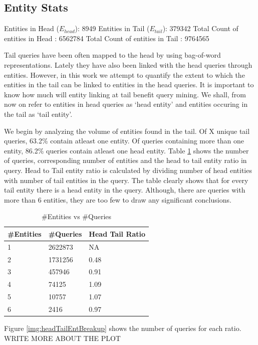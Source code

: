 \subsection{Entity Stats}
Entities in Head ($E_{head}$): 8949
Entities in Tail ($E_{tail}$): 379342
Total Count of entities in Head : 6562784
Total Count of entities in Tail : 9764565
 

Tail queries have been often mapped to the head \cite{} by using bag-of-word representations.
Lately they have also been linked with the head queries through entities. However, in this work
we attempt to quantify the extent to which the entities in the tail can be linked to entities 
in the head queries. It is important to know how much will entity linking at tail benefit query mining. 
We shall, from now on refer to entities in head queries as `head entity' 
and entities occuring in the tail as `tail entity'. 

We begin by analyzing the volume of entities found in the tail. Of X unique tail queries,
63.2\% contain atleast one entity. Of queries containing more than one entity,  
86.2\% queries contain atleast one head entity. Table \ref{table:entDist} shows the number of 
queries, corresponding number of entities and the head to tail entity ratio in query. 
Head to Tail entity ratio is calculated by dividing number of head entities with number of 
tail entities in the query. The table clearly shows that for every tail entity there is a 
head entity in the query. Although, there are queries with more than 6 entities, 
they are too few to draw any significant conclusions. 
\begin{table}
\caption{\#Entities vs \#Queries}
\label{table:entDist}
\centering
\begin{tabular}{|l|l|l|}
\hline
\#Entities & \#Queries & Head Tail Ratio \\ \hline
1 & 2622873 & NA \\ \hline
2 & 1731256 & 0.48 \\ \hline
3 & 457946  & 0.91 \\ \hline
4 & 74125 & 1.09  \\ \hline
5 & 10757 & 1.07 \\ \hline
6 & 2416  & 0.97 \\ \hline
\end{tabular}
\end{table}

Figure \ref{img:headTailEntBreakup} shows the number of queries for each ratio. 
WRITE MORE ABOUT THE PLOT

